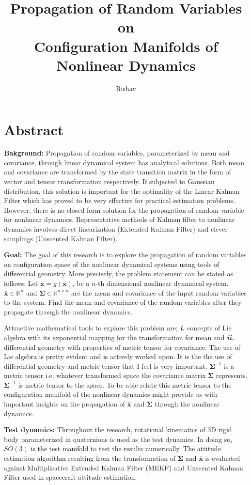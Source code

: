 \documentclass[12pt]{article}
\title{Propagation of Random Variables on \\Configuration Manifolds of \\Nonlinear Dynamics}
\author{Rishav}
\begin{document}
\maketitle

\section*{Abstract}
\textbf{Bakground: } Propagation of random variables, parameterized by mean and covariance, through linear dynamical system has analytical solutions. Both mean and covariance are transformed by the state transition matrix in the form of vector and tensor transformation respectively. If subjected to Gaussian distribution, this solution is important for the optimality of the Linear Kalman Filter which has proved to be very effective for practical estimation problems. However, there is no closed form solution for the propagation of random variable for nonlinear dynamics. Representative methods of Kalman filter to nonlinear dynamics involves direct linearization (Extended Kalman Filter) and clever samplings (Unscented Kalman Filter). \medskip

\noindent 
\textbf{Goal: } The goal of this research is to explore the propagation of random variables on configuration space of the nonlinear dynamical systems using tools of differential geometry. More precisely, the problem statement can be stated as follows: Let $\dot{\bm{x}} = g(\bm{x})$, be a $n$-th dimensional nonlinear dynamical system. $\bar{\bm{x}}\in\mathbb{R}^{n}$ and $\bm{\Sigma}\in\mathbb{R}^{n\times n}$ are the mean and covariance of the input random variables to the system. Find the mean and covariance of the random variables after they propagate through the nonlinear dynamics. \medskip

Attractive mathematical tools to explore this problem are; \textbf{\textit{i.}} concepts of Lie algebra with its exponential mapping for the transformation for mean and \textbf{\textit{ii.}} differential geometry with properties of metric tensor for covariance. The use of Lie algebra is pretty evident and is actively worked upon. It is the the use of differential geometry and metric tensor that I feel is very important. $\bm{\Sigma}^{-1}$ is a metric tensor i.e. whatever transformed space the covariance matrix $\bm{\Sigma}$ represents, $\bm{\Sigma}^{-1}$ is metric tensor to the space. To be able relate this metric tensor to the configuration manifold of the nonlinear dynamics might provide us with important insights on the propagation of $\bar{\bm{x}}$ and $\bm{\Sigma}$ through the nonlinear dynamics. \medskip

\noindent 
\textbf{Test dynamics: } Throughout the research, rotational kinematics of 3D rigid body parameterized in quaternions is used as the test dynamics. In doing so, $SO(3)$ is the test manifold to test the results numerically. The attitude estimation algorithm resulting from the transformation of $\bm{\Sigma}$ and $\bar{\bm{x}}$ is evaluated against Multiplicative Extended Kalman Filter (MEKF) and Unscented Kalman Filter used in spacecraft attitude estimation. 
\end{document}
